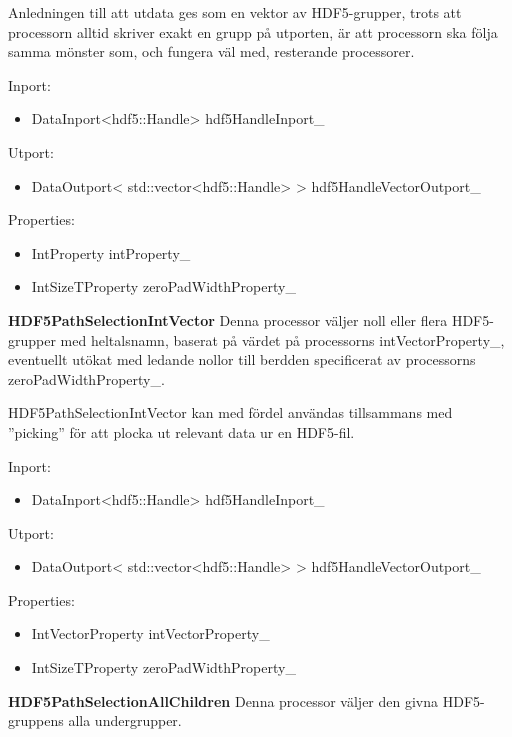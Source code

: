 \documentclass[a4paper,12pt]{article}
\begin{document}
Anledningen till att utdata ges som en vektor av HDF5-grupper, trots att processorn alltid skriver exakt en grupp på utporten, är att processorn ska följa samma mönster som, och fungera väl med, resterande processorer.

Inport:
\begin{itemize}
\item DataInport<hdf5::Handle> hdf5HandleInport\_
\end{itemize}

Utport:
\begin{itemize}
\item DataOutport< std::vector<hdf5::Handle> > hdf5HandleVectorOutport\_
\end{itemize}

Properties:
\begin{itemize}
\item IntProperty intProperty\_
\item IntSizeTProperty zeroPadWidthProperty\_
\end{itemize}

\textbf{HDF5PathSelectionIntVector} \newline
Denna processor väljer noll eller flera HDF5-grupper med heltalsnamn, baserat på värdet på processorns intVectorProperty\_, eventuellt utökat med ledande nollor till berdden specificerat av processorns zeroPadWidthProperty\_. 

HDF5PathSelectionIntVector kan med fördel användas tillsammans med ''picking'' för att plocka ut relevant data ur en HDF5-fil.

Inport:
\begin{itemize}
\item DataInport<hdf5::Handle> hdf5HandleInport\_
\end{itemize}

Utport:
\begin{itemize}
\item DataOutport< std::vector<hdf5::Handle> > hdf5HandleVectorOutport\_
\end{itemize}

Properties:
\begin{itemize}
\item IntVectorProperty intVectorProperty\_
\item IntSizeTProperty zeroPadWidthProperty\_
\end{itemize}

\textbf{HDF5PathSelectionAllChildren}\newline
Denna processor väljer den givna HDF5-gruppens alla undergrupper.
\end{document}
